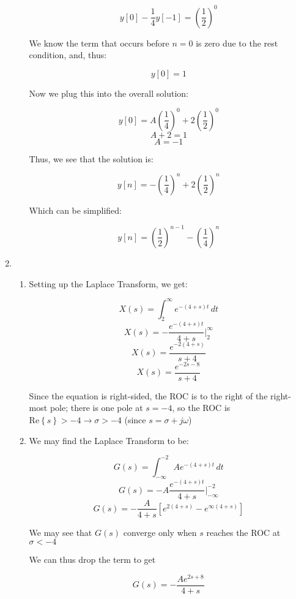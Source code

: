 \begin{enumerate}
\begin{enumerate}
        $$y[0]-\frac{1}{4}y[-1]=\left( \frac{1}{2} \right)^{0}$$

        We know the term that occurs before $n=0$ is zero due to the rest condition, and, thus:

        $$y[0]=1$$

        Now we plug this into the overall solution:

        $$y[0]=A\left( \frac{1}{4} \right)^0+2\left( \frac{1}{2} \right)^0$$
        $$A+2=1$$
        $$\boxed{A=-1}$$

        Thus, we see that the solution is:

        $$y[n]=-\left( \frac{1}{4} \right)^n+2\left( \frac{1}{2} \right)^n$$

        Which can be simplified:

        $$\boxed{y[n]=\left( \frac{1}{2} \right)^{n-1}-\left( \frac{1}{4} \right)^n}$$

    \end{enumerate}

  \item

    \begin{enumerate}

      \item 

        Setting up the Laplace Transform, we get:

        $$X(s)=\int_{2}^{\infty}e^{-(4+s)t}\,dt$$
        $$X(s)=-\frac{e^{-(4+s)t}}{4+s}\Big|_2^{\infty}$$
        $$X(s)=\frac{e^{-2(4+s)}}{s+4}$$
        $$\boxed{X(s)=\frac{e^{-2s-8}}{s+4}}$$

        Since the equation is right-sided, the ROC is to the right of the right-most pole; there is one pole at $s=-4$, so the ROC is $\text{Re}\left\{ s \right\}>-4\longrightarrow \sigma >-4$ (since $s=\sigma+j\omega$)

      \item 

        We may find the Laplace Transform to be:

        $$G(s)=\int_{-\infty}^{-2} Ae^{-(4+s)t}\,dt$$
        $$G(s)=-A\frac{e^{-(4+s)t}}{4+s}\Big|_{-\infty}^{-2}$$
        $$G(s)=-\frac{A}{4+s}\left[e^{2(4+s)}-e^{\infty(4+s)}\right]$$

        We may see that $G(s)$ converge only when $s$ reaches the ROC at $\sigma<-4$

        We can thus drop the term to get

        $$G(s)=-\frac{Ae^{2s+8}}{4+s}$$


\end{enumerate}
\end{enumerate}
